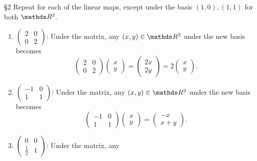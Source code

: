 \documentclass{review-sheet}
\begin{document}
\begin{problem}{\S 2}
  Repeat for each of the linear maps, except under the basis $(1,0),(1,1)$ for both $\R^2$.
\end{problem}
\begin{solution}
  [Note: the solutions to (b) and (c) operate under the assumption that $y=x$ remains the same; that
  is, $y=x$ represents the line passing through the origin and (1,1) under the standard basis.
  Otherwise, the answers would be identical to the ones provided in Problem 1, which seemed rather
  uneducational.]
  \begin{enumerate}[label=(\alph*)]
    \item $\begin{pmatrix} 2&0\\0&2 \end{pmatrix} $: Under the matrix, any $(x,y)\in \R^2$ under
      the new basis becomes \[
        \begin{pmatrix} 2&0\\0&2 \end{pmatrix} \begin{pmatrix} x\\y \end{pmatrix} =\begin{pmatrix}
        2x\\2y\end{pmatrix} =2\begin{pmatrix} x\\y \end{pmatrix} 
      .\]
      \item $\begin{pmatrix} -1&0\\1&1 \end{pmatrix} $: Under the matrix, any $(x,y)\in \R^2$ 
        under the new basis becomes \[
          \begin{pmatrix} -1&0\\1&1 \end{pmatrix} \begin{pmatrix} x\\y \end{pmatrix}
          =\begin{pmatrix} -x\\x+y \end{pmatrix}
        .\]
        \item $\begin{pmatrix} 0&0\\\frac{1}{2}&1\end{pmatrix} $: Under the matrix, any

\end{enumerate}
\end{solution}
\end{document}

